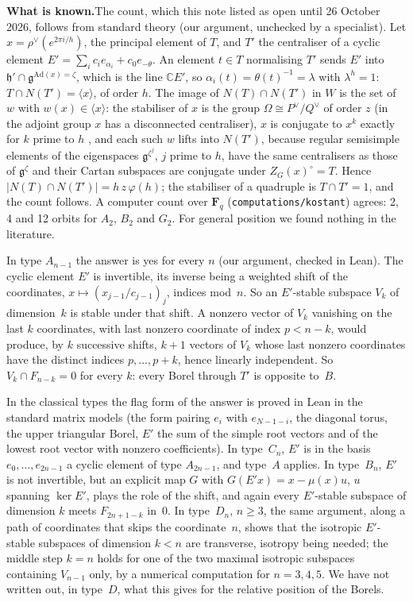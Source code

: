 \documentclass[11pt]{article}
\theoremstyle{definition}
\theoremstyle{plain}\newtheorem*{proposition}{Proposition}\theoremstyle{definition}
\newcommand{\entry}[1]{\par\medskip\noindent\textbf{#1}\enspace}
\newcommand{\known}{\entry{What is known.}}
\begin{document}
\known The count, which this note listed as open until 26 October 2026, follows from standard theory (our argument, unchecked by a specialist). Let $x = \rho^\vee(e^{2\pi i/h})$, the principal element of $T$, and $T'$ the centraliser of a cyclic element $E' = \sum_i c_i e_{\alpha_i} + c_0 e_{-\theta}$. An element $t \in T$ normalising $T'$ sends $E'$ into $\mathfrak h' \cap \mathfrak g^{\mathrm{Ad}(x) = \zeta}$, which is the line $\mathbb C E'$, so $\alpha_i(t) = \theta(t)^{-1} = \lambda$ with $\lambda^h = 1$: $T \cap N(T') = \langle x \rangle$, of order $h$. The image of $N(T) \cap N(T')$ in $W$ is the set of $w$ with $w(x) \in \langle x \rangle$: the stabiliser of $x$ is the group $\Omega \cong P^\vee / Q^\vee$ of order $z$ (in the adjoint group $x$ has a disconnected centraliser), $x$ is conjugate to $x^k$ exactly for $k$ prime to $h$ \cite{kostant,springer}, and each such $w$ lifts into $N(T')$, because regular semisimple elements of the eigenspaces $\mathfrak g^{\zeta^j}$, $j$ prime to $h$, have the same centralisers as those of $\mathfrak g^{\zeta}$ and their Cartan subspaces are conjugate under $Z_G(x)^\circ = T$. Hence $|N(T) \cap N(T')| = h\,z\,\varphi(h)$; the stabiliser of a quadruple is $T \cap T' = 1$, and the count follows. A computer count over $\mathbf F_q$ (\nolinkurl{computations/kostant}) agrees: 2, 4 and 12 orbits for $A_2$, $B_2$ and $G_2$. For general position we found nothing in the literature.

In type $A_{n-1}$ the answer is yes for every $n$ (our argument, checked in Lean). The cyclic element $E'$ is invertible, its inverse being a weighted shift of the coordinates, $x \mapsto (x_{j-1}/c_{j-1})_j$, indices mod~$n$. So an $E'$-stable subspace $V_k$ of dimension~$k$ is stable under that shift. A nonzero vector of $V_k$ vanishing on the last $k$ coordinates, with last nonzero coordinate of index $p < n-k$, would produce, by $k$ successive shifts, $k+1$ vectors of $V_k$ whose last nonzero coordinates have the distinct indices $p, \dots, p+k$, hence linearly independent. So $V_k \cap F_{n-k} = 0$ for every $k$: every Borel through $T'$ is opposite to~$B$.

In the classical types the flag form of the answer is proved in Lean in the standard matrix models (the form pairing $e_i$ with $e_{N-1-i}$, the diagonal torus, the upper triangular Borel, $E'$ the sum of the simple root vectors and of the lowest root vector with nonzero coefficients). In type~$C_n$, $E'$ is in the basis $e_0, \dots, e_{2n-1}$ a cyclic element of type $A_{2n-1}$, and type~$A$ applies. In type~$B_n$, $E'$ is not invertible, but an explicit map $G$ with $G(E'x) = x - \mu(x)u$, $u$ spanning $\ker E'$, plays the role of the shift, and again every $E'$-stable subspace of dimension $k$ meets $F_{2n+1-k}$ in~$0$. In type~$D_n$, $n \geq 3$, the same argument, along a path of coordinates that skips the coordinate~$n$, shows that the isotropic $E'$-stable subspaces of dimension $k < n$ are transverse, isotropy being needed; the middle step $k = n$ holds for one of the two maximal isotropic subspaces containing $V_{n-1}$ only, by a numerical computation for $n = 3, 4, 5$. We have not written out, in type~$D$, what this gives for the relative position of the Borels.
\end{document}
